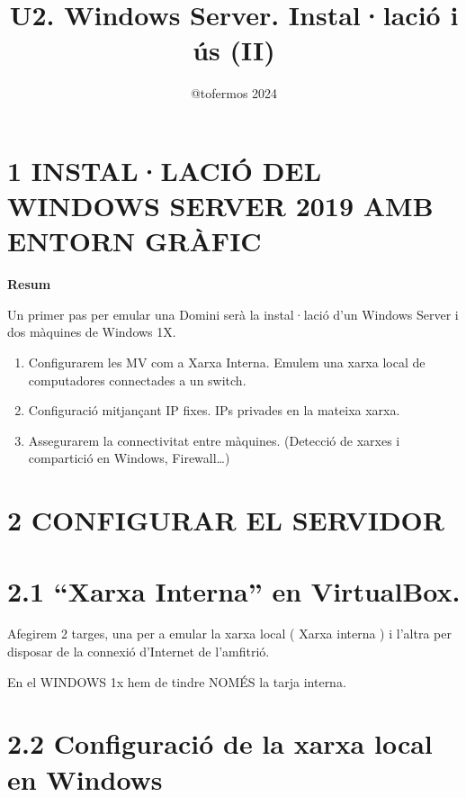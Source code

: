 \documentclass[
  a4paper,
]{article}
\title{U2. Windows Server. Instal·lació i ús (II)}
\author{@tofermos 2024}
\date{}
\begin{document}
\maketitle

{
\setcounter{tocdepth}{2}
\tableofcontents
}
\newpage
\renewcommand\tablename{Tabla}

\section{1 INSTAL·LACIÓ DEL WINDOWS SERVER 2019 AMB ENTORN
GRÀFIC}\label{installaciuxf3-del-windows-server-2019-amb-entorn-gruxe0fic}

\textbf{Resum}

Un primer pas per emular una Domini serà la instal·lació d'un Windows
Server i dos màquines de Windows 1X.

\begin{enumerate}
\def\labelenumi{\arabic{enumi}.}
\item
  Configurarem les MV com a Xarxa Interna. Emulem una xarxa local de
  computadores connectades a un switch.
\item
  Configuració mitjançant IP fixes. IPs privades en la mateixa xarxa.
\item
  Assegurarem la connectivitat entre màquines. (Detecció de xarxes i
  compartició en Windows, Firewall\ldots)
\end{enumerate}

\section{2 CONFIGURAR EL SERVIDOR}\label{configurar-el-servidor}

\section{2.1 ``Xarxa Interna'' en
VirtualBox.}\label{xarxa-interna-en-virtualbox.}

Afegirem 2 targes, una per a emular la xarxa local ( Xarxa interna ) i
l'altra per disposar de la connexió d'Internet de l'amfitrió.

En el WINDOWS 1x hem de tindre NOMÉS la tarja interna.

\section{2.2 Configuració de la xarxa local en
Windows}\label{configuraciuxf3-de-la-xarxa-local-en-windows}
\end{document}
